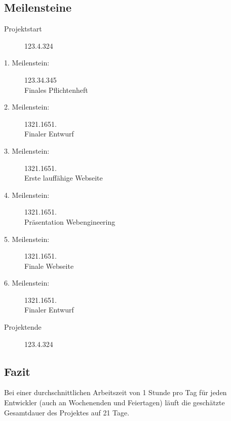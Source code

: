 
\newpage
\subsection{Meilensteine}
\begin{description}
	\item[Projektstart] 123.4.324
	\item[1. Meilenstein:] 123.34.345\\
	Finales Pflichtenheft
	\item[2. Meilenstein:] 1321.1651.\\
	Finaler Entwurf
	\item[3. Meilenstein:] 1321.1651.\\
	Erste lauffähige Webseite
	\item[4. Meilenstein:] 1321.1651.\\
	Präsentation Webengineering
	\item[5. Meilenstein:] 1321.1651.\\
	Finale Webseite
	\item[6. Meilenstein:] 1321.1651.\\
	Finaler Entwurf
	\item[Projektende] 123.4.324
\end{description}

\subsection{Fazit}
Bei einer durchschnittlichen Arbeitszeit von 1 Stunde pro Tag für jeden Entwickler (auch an Wochenenden und Feiertagen) läuft die geschätzte Gesamtdauer des Projektes auf 21 Tage.